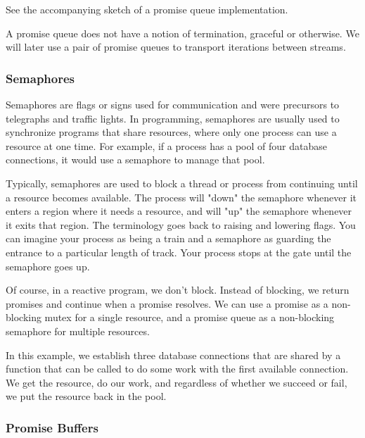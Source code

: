 See the accompanying sketch of a promise queue implementation.

A promise queue does not have a notion of termination, graceful or otherwise. We will later use a pair of promise queues to transport iterations between streams.

\subsubsection{Semaphores}

Semaphores are flags or signs used for communication and were precursors to telegraphs and traffic lights. In programming, semaphores are usually used to synchronize programs that share resources, where only one process can use a resource at one time. For example, if a process has a pool of four database connections, it would use a semaphore to manage that pool.

Typically, semaphores are used to block a thread or process from continuing until a resource becomes available. The process will "down" the semaphore whenever it enters a region where it needs a resource, and will "up" the semaphore whenever it exits that region. The terminology goes back to raising and lowering flags. You can imagine your process as being a train and a semaphore as guarding the entrance to a particular length of track. Your process stops at the gate until the semaphore goes up.

Of course, in a reactive program, we don’t block. Instead of blocking, we return promises and continue when a promise resolves. We can use a promise as a non-blocking mutex for a single resource, and a promise queue as a non-blocking semaphore for multiple resources.

In this example, we establish three database connections that are shared by a function that can be called to do some work with the first available connection. We get the resource, do our work, and regardless of whether we succeed or fail, we put the resource back in the pool.



\subsubsection{Promise Buffers}

